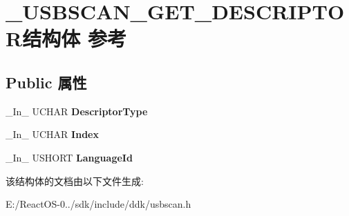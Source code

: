 \hypertarget{struct___u_s_b_s_c_a_n___g_e_t___d_e_s_c_r_i_p_t_o_r}{}\section{\+\_\+\+U\+S\+B\+S\+C\+A\+N\+\_\+\+G\+E\+T\+\_\+\+D\+E\+S\+C\+R\+I\+P\+T\+O\+R结构体 参考}
\label{struct___u_s_b_s_c_a_n___g_e_t___d_e_s_c_r_i_p_t_o_r}
\subsection*{Public 属性}
\begin{DoxyCompactItemize}
\item 
\mbox{\label{struct___u_s_b_s_c_a_n___g_e_t___d_e_s_c_r_i_p_t_o_r_a0677d563ecc4f49edca2dbe13e2bb78b}} 
\+\_\+\+In\+\_\+ U\+C\+H\+AR {\bfseries Descriptor\+Type}
\item 
\mbox{\label{struct___u_s_b_s_c_a_n___g_e_t___d_e_s_c_r_i_p_t_o_r_a17ec6ba6d69ce8bc6ed3c44760bbbd9f}} 
\+\_\+\+In\+\_\+ U\+C\+H\+AR {\bfseries Index}
\item 
\mbox{\label{struct___u_s_b_s_c_a_n___g_e_t___d_e_s_c_r_i_p_t_o_r_aa3752fb8ddfc4c2c7d126d593ee20289}} 
\+\_\+\+In\+\_\+ U\+S\+H\+O\+RT {\bfseries Language\+Id}
\end{DoxyCompactItemize}


该结构体的文档由以下文件生成\+:\begin{DoxyCompactItemize}
\item 
E\+:/\+React\+O\+S-\/0../sdk/include/ddk/usbscan.\+h\end{DoxyCompactItemize}

